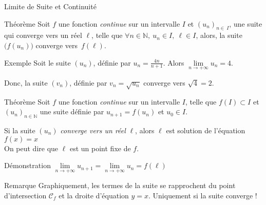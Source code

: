 \documentclass{cours}
\begin{document}
    \begin{Gpartie}{Limite de Suite et Continuité} 
        \begin{Spartie}{Théorème} 
            Soit $f$ une fonction \emph{continue} sur un intervalle $I$ et $(u_n)_{n\in\ I}$, une suite qui converge vers un réel $\ell$, telle que $\forall n\in\mathbb{N},\ u_n\in I,~\ell\in I$, alors, la suite $\big(f(u_n)\big)$ converge vers~$f(\ell)$.
            \begin{SSpartie}{Exemple} 
                Soit le suite $(u_n)$, définie par $u_n=\frac{4n}{n+1}$. Alors $\lim\limits_{n\to +\infty}u_n=4$.
                
                Donc, la suite $(v_n)$, définie par $v_n=\sqrt{u_n}$ converge vers $\sqrt{4}=2$.
            \end{SSpartie}
        \end{Spartie}
        \begin{Spartie}{Théorème}
            Soit $f$ une fonction \emph{continue} sur un intervalle $I$, telle que $f(I)\subset I$ et $(u_n)_{n\in\mathbb{N}}$ une suite définie par $u_{n+1}=f(u_n)$ et $u_0\in I$.
            
            Si la suite $(u_n)$ \emph{converge vers un réel} $\ell$, alors $\ell$ est solution de l'équation $f(x)=x$ \\ On peut dire que $\ell$ est un point fixe de $f$.
            \begin{SSpartie}{Démonstration} 
                $\lim\limits_{n\to +\infty}u_{n+1}=\lim\limits_{n\to +\infty}u_n=f(\ell)$
            \end{SSpartie}
            \pagebreak
            \begin{SSpartie}{Remarque} 
                Graphiquement, les termes de la suite se rapprochent du point d'intersection $\mathcal{C}_f$ et la droite d'équation $y=x$. Uniquement si la suite converge !
                \begin{center}
\end{center}
\end{SSpartie}
\end{Spartie}
\end{Gpartie}
\end{document}
